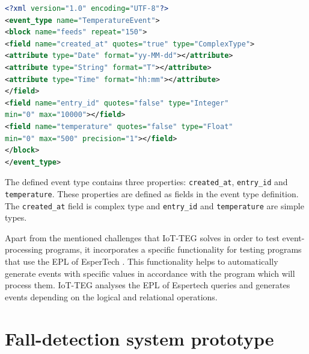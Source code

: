 \documentclass[review]{elsarticle}
\begin{document}
\begin{lstlisting}[basicstyle=\ttfamily\footnotesize,language=XML,caption=Event type definition example,label=eventTypeDef]
<?xml version="1.0" encoding="UTF-8"?>
<event_type name="TemperatureEvent">
<block name="feeds" repeat="150">
<field name="created_at" quotes="true" type="ComplexType">
<attribute type="Date" format="yy-MM-dd"></attribute>
<attribute type="String" format="T"></attribute>
<attribute type="Time" format="hh:mm"></attribute>
</field>
<field name="entry_id" quotes="false" type="Integer" 
min="0" max="10000"></field>
<field name="temperature" quotes="false" type="Float" 
min="0" max="500" precision="1"></field>
</block>
</event_type>
\end{lstlisting}

The defined event type contains three properties: \texttt{created\_at},
\texttt{entry\_id} and \texttt{temperature}. These properties are defined as
fields in the event type definition. The \texttt{created\_at} field is complex
type and \texttt{entry\_id} and \texttt{temperature} are simple types. 

Apart from the mentioned challenges that IoT-TEG solves in order to test 
event-processing programs, it incorporates a specific functionality
for testing programs that use the EPL of EsperTech \cite{Esper:2016}. This functionality helps to 
automatically generate events with specific values in accordance with the 
program which will process them. IoT-TEG analyses the EPL of Espertech queries and 
generates events depending on the logical and relational operations. 

\section{Fall-detection system prototype}
\label{sec:fall-detectionPrototype}	
\end{document}
